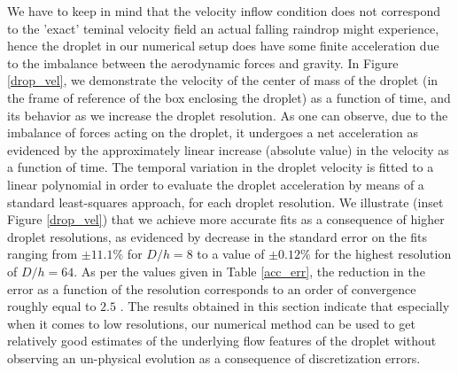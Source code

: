\vspace*{0.2cm}


We have to keep in mind that the velocity inflow condition does not correspond to the 'exact' teminal velocity field an actual falling raindrop might experience, hence the droplet in our numerical setup does have some finite acceleration due to the imbalance between the aerodynamic forces and gravity. In Figure \ref{drop_vel}, we demonstrate the velocity of the center of mass of the droplet (in the frame of reference of the box enclosing the droplet) as a function of time, and its behavior as we increase the droplet resolution. As one can observe, due to the imbalance of forces acting on the droplet, it undergoes a net acceleration as evidenced by the approximately linear increase (absolute value) in the velocity as a function of time. The temporal variation in the droplet velocity is fitted to a linear polynomial in order to evaluate the droplet acceleration by means of a standard least-squares approach, for each droplet resolution. We illustrate (inset Figure \ref{drop_vel}) that we achieve more accurate fits as a consequence of higher droplet resolutions, as evidenced by decrease in the standard error on the fits ranging from $\pm 11.1 \%$ for $D/h = 8$ to a value of $\pm 0.12 \%$ for the highest resolution of $D/h = 64$. As per the values given in Table \ref{acc_err}, the reduction in the error as a function of the resolution corresponds to an order of convergence roughly equal to $2.5$ . The results obtained in this section indicate that especially when it comes to low resolutions, our numerical method can be used to get relatively good estimates of the underlying flow features of the droplet without observing an un-physical evolution as a consequence of discretization errors.           


%

